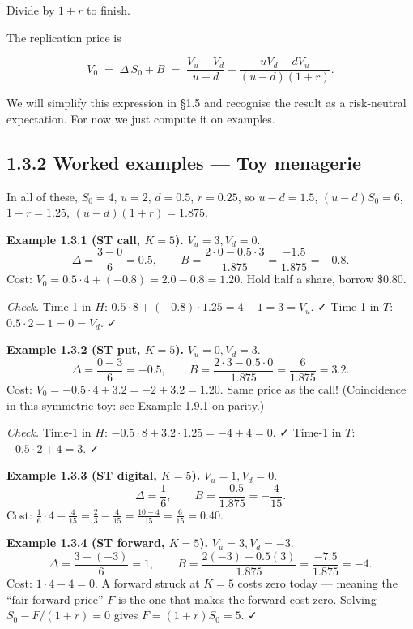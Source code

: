 \documentclass[
  10pt,
  twoside]{book}
\begin{document}
Divide by \(1+r\) to finish.

The replication price is

\[V_0 \;=\; \Delta\, S_0 + B \;=\; \frac{V_u-V_d}{u-d} + \frac{uV_d - dV_u}{(u-d)(1+r)}.\]

We will simplify this expression in §1.5 and recognise the result as a
risk-neutral expectation. For now we just compute it on examples.

\subsection{1.3.2 Worked examples --- Toy
menagerie}\label{worked-examples-toy-menagerie}

In all of these, \(S_0=4\), \(u=2\), \(d=0.5\), \(r=0.25\), so
\(u-d=1.5\), \((u-d)S_0=6\), \(1+r=1.25\), \((u-d)(1+r)=1.875\).

\textbf{Example 1.3.1 (ST call, \(K=5\)).} \(V_u=3, V_d=0\).
\[\Delta = \frac{3-0}{6} = 0.5, \qquad B = \frac{2\cdot 0 - 0.5\cdot 3}{1.875} = \frac{-1.5}{1.875} = -0.8.\]
Cost: \(V_0 = 0.5\cdot 4 + (-0.8) = 2.0 - 0.8 = \boxed{1.20}\). Hold
half a share, borrow \(\$0.80\).

\emph{Check.} Time-1 in \(H\):
\(0.5\cdot 8 + (-0.8)\cdot 1.25 = 4 - 1 = 3 = V_u\). ✓ Time-1 in \(T\):
\(0.5\cdot 2 - 1 = 0 = V_d\). ✓

\textbf{Example 1.3.2 (ST put, \(K=5\)).} \(V_u=0, V_d=3\).
\[\Delta = \frac{0-3}{6} = -0.5, \qquad B = \frac{2\cdot 3 - 0.5\cdot 0}{1.875} = \frac{6}{1.875} = 3.2.\]
Cost: \(V_0 = -0.5\cdot 4 + 3.2 = -2 + 3.2 = \boxed{1.20}\). Same price
as the call! (Coincidence in this symmetric toy: see Example 1.9.1 on
parity.)

\emph{Check.} Time-1 in \(H\):
\(-0.5\cdot 8 + 3.2\cdot 1.25 = -4 + 4 = 0\). ✓ Time-1 in \(T\):
\(-0.5\cdot 2 + 4 = 3\). ✓

\textbf{Example 1.3.3 (ST digital, \(K=5\)).} \(V_u=1, V_d=0\).
\[\Delta = \frac{1}{6}, \qquad B = \frac{-0.5}{1.875} = -\frac{4}{15}.\]
Cost:
\(\frac{1}{6}\cdot 4 - \frac{4}{15} = \frac{2}{3} - \frac{4}{15} = \frac{10-4}{15} = \frac{6}{15} = 0.40\).

\textbf{Example 1.3.4 (ST forward, \(K=5\)).} \(V_u=3, V_d=-3\).
\[\Delta = \frac{3-(-3)}{6} = 1, \qquad B = \frac{2(-3) - 0.5(3)}{1.875} = \frac{-7.5}{1.875} = -4.\]
Cost: \(1\cdot 4 - 4 = 0\). A forward struck at \(K=5\) costs zero today
--- meaning the ``fair forward price'' \(F\) is the one that makes the
forward cost zero. Solving \(S_0 - F/(1+r) = 0\) gives
\(F = (1+r)S_0 = 5\). ✓
\end{document}
